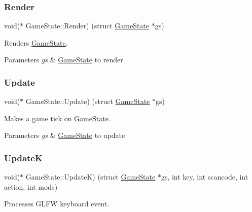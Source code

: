 \subsubsection{\texorpdfstring{Render}{Render}}
{\footnotesize\ttfamily void($\ast$ Game\+State\+::\+Render) (struct \mbox{\hyperlink{struct_game_state}{Game\+State}} $\ast$gs)}



Renders \mbox{\hyperlink{struct_game_state}{Game\+State}}. 


\begin{DoxyParams}{Parameters}
{\em gs} & \mbox{\hyperlink{struct_game_state}{Game\+State}} to render \\
\hline
\end{DoxyParams}
\mbox{\label{struct_game_state_acbaac59530e6b6281aeeb4c6054ab137}} 
\subsubsection{\texorpdfstring{Update}{Update}}
{\footnotesize\ttfamily void($\ast$ Game\+State\+::\+Update) (struct \mbox{\hyperlink{struct_game_state}{Game\+State}} $\ast$gs)}



Makes a game tick on \mbox{\hyperlink{struct_game_state}{Game\+State}}. 


\begin{DoxyParams}{Parameters}
{\em gs} & \mbox{\hyperlink{struct_game_state}{Game\+State}} to update \\
\hline
\end{DoxyParams}
\mbox{\label{struct_game_state_a2b9efd2a4168b1973ee002a75d8298b5}} 
\subsubsection{\texorpdfstring{UpdateK}{UpdateK}}
{\footnotesize\ttfamily void($\ast$ Game\+State\+::\+UpdateK) (struct \mbox{\hyperlink{struct_game_state}{Game\+State}} $\ast$gs, int key, int scancode, int action, int mods)}



Processes G\+L\+FW keyboard event. 



